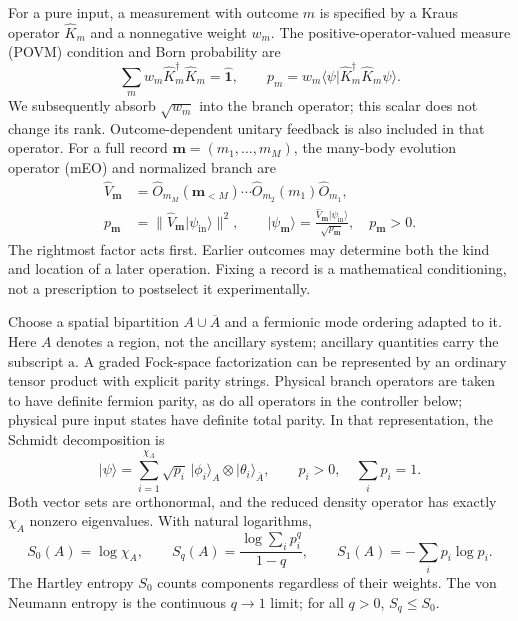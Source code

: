 \documentclass[aps,prb,onecolumn,nofootinbib,superscriptaddress]{revtex4-2}
\newcommand{\One}{\hat{\mathbf{1}}}
\newcommand{\ket}[1]{\lvert #1\rangle}
\newcommand{\braket}[2]{\langle #1\vert #2\rangle}
\newcommand{\Abar}{\overline A}
\begin{document}
For a pure input, a measurement with outcome $m$ is specified by a Kraus
operator $\hat K_m$ and a nonnegative weight $w_m$. The
positive-operator-valued measure (POVM) condition and Born probability are
\begin{equation}
 \sum_m w_m\hat K_m^\dagger\hat K_m=\One,\qquad
 p_m=w_m\braket{\psi}{\hat K_m^\dagger\hat K_m\psi}.
 \label{eq:povm}
\end{equation}
We subsequently absorb $\sqrt{w_m}$ into the branch operator; this scalar
does not change its rank. Outcome-dependent unitary feedback is also
included in that operator. For a full record $\boldsymbol m=(m_1,\ldots,m_M)$,
the many-body evolution operator (mEO) and normalized branch are
\begin{align}
 \hat V_{\boldsymbol m}
 &=\hat O_{m_M}(\boldsymbol m_{<M})\cdots\hat O_{m_2}(m_1)\hat O_{m_1},
 \label{eq:branch-word}\\
 p_{\boldsymbol m}
 &=\|\hat V_{\boldsymbol m}\ket{\psi_{\mathrm{in}}}\|^2,\qquad
 \ket{\psi_{\boldsymbol m}}
 =\frac{\hat V_{\boldsymbol m}\ket{\psi_{\mathrm{in}}}}
 {\sqrt{p_{\boldsymbol m}}},\quad p_{\boldsymbol m}>0.
 \label{eq:normalized-branch}
\end{align}
The rightmost factor acts first. Earlier outcomes may determine both the
kind and location of a later operation. Fixing a record is a mathematical
conditioning, not a prescription to postselect it experimentally.

Choose a spatial bipartition $A\cup\Abar$ and a fermionic mode ordering
adapted to it. Here $A$ denotes a region, not the ancillary system; ancillary
quantities carry the subscript $\mathrm a$. A graded Fock-space
factorization can be represented by an ordinary tensor product with
explicit parity strings. Physical branch operators are taken to have
definite fermion parity, as do all operators in the controller below;
physical pure input states have definite total parity. In that
representation, the Schmidt decomposition is
\begin{equation}
 \ket{\psi}=\sum_{i=1}^{\chi_A}\sqrt{p_i}\,
 \ket{\phi_i}_A\otimes\ket{\theta_i}_{\Abar},
 \qquad p_i>0,\quad\sum_i p_i=1.
 \label{eq:schmidt}
\end{equation}
Both vector sets are orthonormal, and the reduced density operator has
exactly $\chi_A$ nonzero eigenvalues. With natural logarithms,
\begin{equation}
 S_0(A)=\log\chi_A,\qquad
 S_q(A)=\frac{\log\sum_i p_i^q}{1-q},\qquad
 S_1(A)=-\sum_i p_i\log p_i .
 \label{eq:entropies}
\end{equation}
The Hartley entropy $S_0$ counts components regardless of their weights.
The von Neumann entropy is the continuous $q\to1$ limit; for all $q>0$,
$S_q\leq S_0$.
\end{document}
